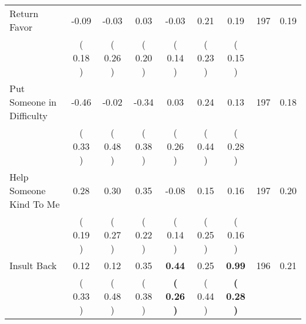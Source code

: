 \begin{tabular}{lcccccccc}
Return Favor &     -0.09 &     -0.03 &      0.03 &     -0.03 &      0.21 &      0.19 & 197 &       0.19 \\ 
 & (     0.18 ) & (     0.26 ) & (     0.20 ) & (     0.14 ) & (     0.23 ) & (     0.15 ) & \\
Put Someone in Difficulty &     -0.46 &     -0.02 &     -0.34 &      0.03 &      0.24 &      0.13 & 197 &       0.18 \\ 
 & (     0.33 ) & (     0.48 ) & (     0.38 ) & (     0.26 ) & (     0.44 ) & (     0.28 ) & \\
Help Someone Kind To Me &      0.28 &      0.30 &      0.35 &     -0.08 &      0.15 &      0.16 & 197 &       0.20 \\ 
 & (     0.19 ) & (     0.27 ) & (     0.22 ) & (     0.14 ) & (     0.25 ) & (     0.16 ) & \\
Insult Back &      0.12 &      0.12 &      0.35 & \textbf{     0.44} &      0.25 & \textbf{     0.99} & 196 &       0.21 \\ 
 & (     0.33 ) & (     0.48 ) & (     0.38 ) & \textbf{(     0.26 )} & (     0.44 ) & \textbf{(     0.28 )} & \\
\bottomrule
\end{tabular}
